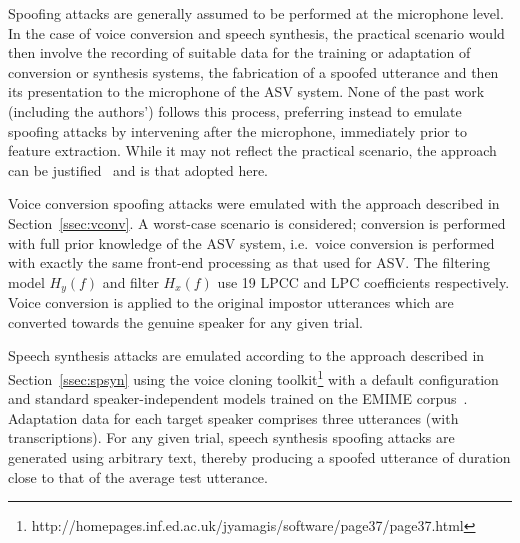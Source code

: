 
Spoofing attacks are generally assumed to be performed at the microphone level.
In the case of voice conversion and speech synthesis, the practical scenario would then involve the recording of suitable data for the training or adaptation of conversion or synthesis systems, the fabrication of a spoofed utterance and then its presentation to the microphone of the ASV system.
None of the past work (including the authors') follows this process, preferring instead to emulate spoofing attacks by intervening after the microphone, immediately prior to feature extraction.
While it may not reflect the practical scenario, the approach can be justified~\cite{} and is that adopted here.

Voice conversion spoofing attacks were emulated with the approach described in Section~\ref{ssec:vconv}. 
A worst-case scenario is considered; conversion is performed with full prior knowledge of the ASV system, i.e.\ voice conversion is performed with exactly the same front-end processing as that used for ASV.
The filtering model $H_y(f)$ and filter $H_x(f)$ use 19 LPCC and LPC coefficients respectively.
Voice conversion is applied to the original impostor utterances which are converted towards the genuine speaker for any given trial.

Speech synthesis attacks are emulated according to the approach described in Section~\ref{ssec:spsyn} using the voice cloning toolkit\footnote{http://homepages.inf.ed.ac.uk/jyamagis/software/page37/page37.html} with a default configuration and standard speaker-independent models trained on the EMIME corpus~\cite{Wester2010}.  
Adaptation data for each target speaker comprises three utterances (with transcriptions).  
For any given trial, speech synthesis spoofing attacks are generated using arbitrary text, thereby producing a spoofed utterance of duration close to that of the average test utterance.
